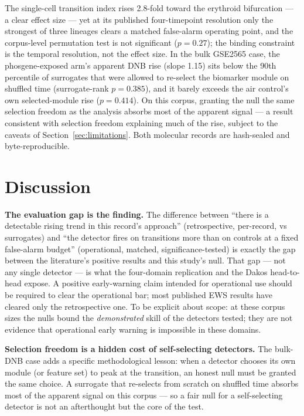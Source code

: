 \documentclass[11pt]{article}
\begin{document}
The single-cell transition index rises 2.8-fold toward the erythroid
bifurcation --- a clear effect size --- yet at its published
four-timepoint resolution only the strongest of three lineages clears a
matched false-alarm operating point, and the corpus-level permutation
test is not significant ($p = 0.27$); the binding constraint is the
temporal resolution, not the effect size. In the bulk GSE2565 case, the
phosgene-exposed arm's apparent DNB rise (slope 1.15) sits below the
90th percentile of surrogates that were allowed to re-select the
biomarker module on shuffled time (surrogate-rank $p = 0.385$), and it
barely exceeds the air control's own selected-module rise
($p = 0.414$). On this corpus, granting the null the same selection
freedom as the analysis absorbs most of the apparent signal --- a
result consistent with selection freedom explaining much of the rise,
subject to the caveats of Section~\ref{sec:limitations}. Both molecular
records are hash-sealed and byte-reproducible.

\section{Discussion}\label{sec:discussion}

\textbf{The evaluation gap is the finding.} The difference between
``there is a detectable rising trend in this record's approach''
(retrospective, per-record, vs surrogates) and ``the detector fires on
transitions more than on controls at a fixed false-alarm budget''
(operational, matched, significance-tested) is exactly the gap between
the literature's positive results and this study's null. That gap ---
not any single detector --- is what the four-domain replication and the
Dakos head-to-head expose. A positive early-warning claim intended for
operational use should be required to clear the operational bar; most
published EWS results have cleared only the retrospective one. To be
explicit about scope: at these corpus sizes the nulls bound the
\emph{demonstrated} skill of the detectors tested; they are not
evidence that operational early warning is impossible in these
domains.

\textbf{Selection freedom is a hidden cost of self-selecting
detectors.} The bulk-DNB case adds a specific methodological lesson:
when a detector chooses its own module (or feature set) to peak at the
transition, an honest null must be granted the same choice. A surrogate
that re-selects from scratch on shuffled time absorbs most of the
apparent signal on this corpus --- so a fair null for a self-selecting
detector is not an afterthought but the core of the test.
\end{document}
